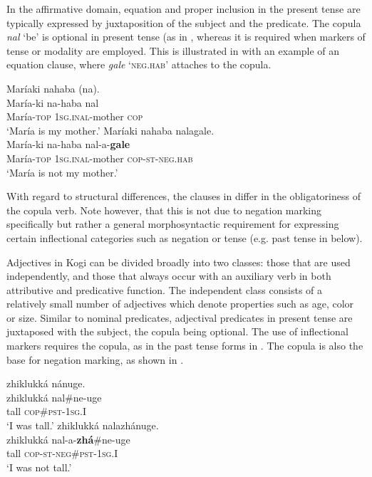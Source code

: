 \documentclass[output=paper,colorlinks,citecolor=brown]{langscibook}
\begin{document}
In the affirmative domain, equation and proper inclusion in the present tense are typically expressed by juxtaposition of the subject and the predicate. The copula \textit{nal} ‘be’ is optional in present tense (as in , whereas it is required when markers of tense or modality are employed. This is illustrated in  with an example of an equation clause, where \textit{\-gale} ‘\textsc{neg.hab’} attaches to the copula.

\ea\label{ex:kog:35}
    \ea\label{ex:kog:35a}Maríaki nahaba (na).\\
        \gll  María-ki na{}-haba nal\\ 
              María-\textsc{top} \textsc{1sg.inal{}-}mother \textsc{cop} \\
        \glt  ‘María is my mother.’
    \ex\label{ex:kog:35b}Maríaki nahaba nalagale.\\
        \gll  María-ki na-haba nal{}-a-\textbf{gale}\\
               María-\textsc{top} \textsc{1sg.inal{}-}mother \textsc{cop{}-st}{}-\textsc{neg.hab}\\
        \glt ‘María is not my mother.’
    \z
\z 

With regard to structural differences, the clauses in  differ in the obligatoriness of the copula verb. Note however, that this is not due to negation marking specifically but rather a general morphosyntactic requirement for expressing certain inflectional categories such as negation or tense (e.g. past tense in  below).

Adjectives in Kogi can be divided broadly into two classes: those that are used independently, and those that always occur with an auxiliary verb in both attributive and predicative function. The independent class consists of a relatively small number of adjectives which denote properties such as age, color or size. Similar to nominal predicates, adjectival predicates in present tense are juxtaposed with the subject, the copula being optional. The use of inflectional markers requires the copula, as in the past tense forms in . The copula is also the base for negation marking, as shown in .

\ea\label{ex:kog:36}
    \ea\label{ex:kog:36a}zhiklukká nánuge.\\
        \gll   zhiklukká nal\#ne-uge\\ 
              tall \textsc{cop}\#\textsc{pst-1sg.I}\\
        \glt  ‘I was tall.’
    \ex\label{ex:kog:36b} zhiklukká nalazhánuge.\\
        \gll  zhiklukká nal{}-a{}-\textbf{zhá}\#ne-uge\\
              tall \textsc{cop}{}-\textsc{st-neg\#pst-1sg.I}\\
        \glt ‘I was not tall.’
    \z
\z 
\end{document}
